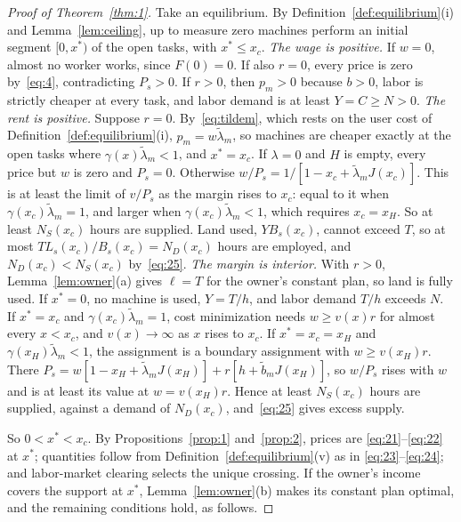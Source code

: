 \documentclass[12pt]{article}
\theoremstyle{plain}
\theoremstyle{definition}
\theoremstyle{remark}
\begin{document}
\begin{proof}[Proof of Theorem~\ref{thm:1}]
Take an equilibrium. By Definition~\ref{def:equilibrium}(i) and Lemma~\ref{lem:ceiling}, up to measure zero machines perform an initial segment $[0,x^*)$ of the open tasks, with $x^*\le x_c$.
\emph{The wage is positive.} If $w=0$, almost no worker works, since $F(0)=0$. If also $r=0$, every price is zero by~\eqref{eq:4}, contradicting $P_s>0$. If $r>0$, then $p_m>0$ because $b>0$, labor is strictly cheaper at every task, and labor demand is at least $Y=C\ge N>0$.
\emph{The rent is positive.} Suppose $r=0$. By~\eqref{eq:tildem}, which rests on the user cost of Definition~\ref{def:equilibrium}(i), $p_m=w\widetilde\lambda_m$, so machines are cheaper exactly at the open tasks where $\gamma(x)\widetilde\lambda_m<1$, and $x^*=x_c$. If $\lambda=0$ and $H$ is empty, every price but $w$ is zero and $P_s=0$. Otherwise $w/P_s=1/[1-x_c+\widetilde\lambda_mJ(x_c)]$. This is at least the limit of $v/P_s$ as the margin rises to $x_c$: equal to it when $\gamma(x_c)\widetilde\lambda_m=1$, and larger when $\gamma(x_c)\widetilde\lambda_m<1$, which requires $x_c=x_H$. So at least $N_S(x_c)$ hours are supplied. Land used, $YB_s(x_c)$, cannot exceed $T$, so at most $TL_s(x_c)/B_s(x_c)=N_D(x_c)$ hours are employed, and $N_D(x_c)<N_S(x_c)$ by~\eqref{eq:25}.
\emph{The margin is interior.} With $r>0$, Lemma~\ref{lem:owner}(a) gives $\ell=T$ for the owner's constant plan, so land is fully used. If $x^*=0$, no machine is used, $Y=T/h$, and labor demand $T/h$ exceeds $N$. If $x^*=x_c$ and $\gamma(x_c)\widetilde\lambda_m=1$, cost minimization needs $w\ge v(x)r$ for almost every $x<x_c$, and $v(x)\to\infty$ as $x$ rises to $x_c$. If $x^*=x_c=x_H$ and $\gamma(x_H)\widetilde\lambda_m<1$, the assignment is a boundary assignment with $w\ge v(x_H)r$. There $P_s=w[1-x_H+\widetilde\lambda_mJ(x_H)]+r[h+\widetilde b_mJ(x_H)]$, so $w/P_s$ rises with $w$ and is at least its value at $w=v(x_H)r$. Hence at least $N_S(x_c)$ hours are supplied, against a demand of $N_D(x_c)$, and~\eqref{eq:25} gives excess supply.

So $0<x^*<x_c$. By Propositions~\ref{prop:1} and~\ref{prop:2}, prices are \eqref{eq:21}--\eqref{eq:22} at $x^*$; quantities follow from Definition~\ref{def:equilibrium}(v) as in \eqref{eq:23}--\eqref{eq:24}; and labor-market clearing selects the unique crossing. If the owner's income covers the support at $x^*$, Lemma~\ref{lem:owner}(b) makes its constant plan optimal, and the remaining conditions hold, as follows.


\end{proof}
\end{document}
